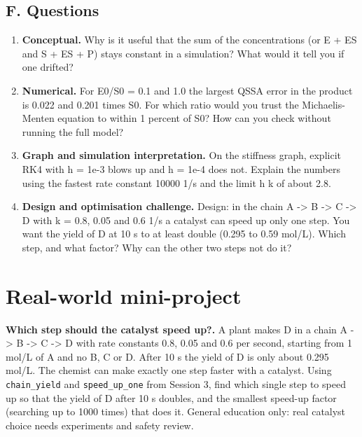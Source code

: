 \documentclass[11pt,a4paper]{article}
\begin{document}
\subsection*{F. Questions}
\begin{enumerate}[nosep]
\item \textbf{Conceptual.} Why is it useful that the sum of the concentrations (or E + ES and S + ES + P) stays constant in a simulation? What would it tell you if one drifted?
\item \textbf{Numerical.} For E0/S0 = 0.1 and 1.0 the largest QSSA error in the product is 0.022 and 0.201 times S0. For which ratio would you trust the Michaelis-Menten equation to within 1 percent of S0? How can you check without running the full model?
\item \textbf{Graph and simulation interpretation.} On the stiffness graph, explicit RK4 with h = 1e-3 blows up and h = 1e-4 does not. Explain the numbers using the fastest rate constant 10000 1/s and the limit h k of about 2.8.
\item \textbf{Design and optimisation challenge.} Design: in the chain A -\textgreater{} B -\textgreater{} C -\textgreater{} D with k = 0.8, 0.05 and 0.6 1/s a catalyst can speed up only one step. You want the yield of D at 10 s to at least double (0.295 to 0.59 mol/L). Which step, and what factor? Why can the other two steps not do it?
\end{enumerate}

\section{Real-world mini-project}
\textbf{Which step should the catalyst speed up?.} A plant makes D in a chain A -\textgreater{} B -\textgreater{} C -\textgreater{} D with rate constants 0.8, 0.05 and 0.6 per second, starting from 1 mol/L of A and no B, C or D. After 10 s the yield of D is only about 0.295 mol/L. The chemist can make exactly one step faster with a catalyst. Using \texttt{chain\_yield} and \texttt{speed\_up\_one} from Session 3, find which single step to speed up so that the yield of D after 10 s doubles, and the smallest speed-up factor (searching up to 1000 times) that does it. General education only: real catalyst choice needs experiments and safety review.
\end{document}
